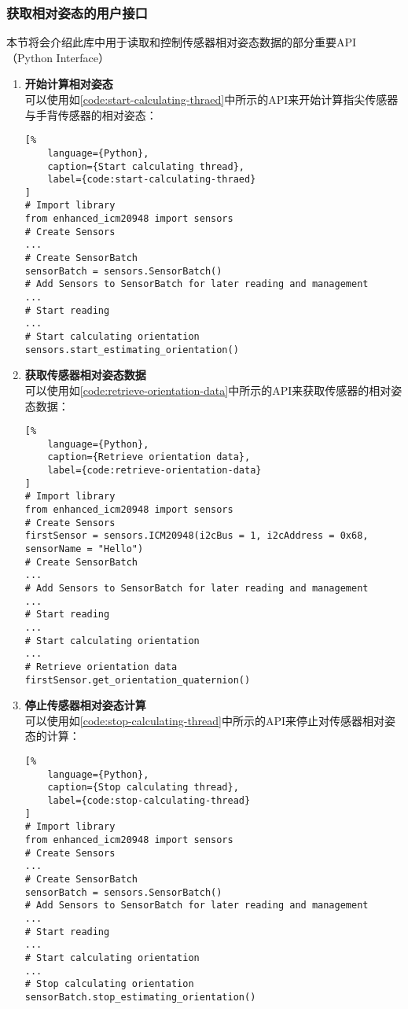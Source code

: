 \subsubsection{获取相对姿态的用户接口}
本节将会介绍此库中用于读取和控制传感器相对姿态数据的部分重要API（Python Interface）
\begin{enumerate}[label=(\alph*)]
    \item {\bfseries 开始计算相对姿态} \\
可以使用如\autoref{code:start-calculating-thraed}中所示的API来开始计算指尖传感器与手背传感器的相对姿态：
\begin{lstlisting}[%
    language={Python},
    caption={Start calculating thread},
    label={code:start-calculating-thraed}
]
# Import library
from enhanced_icm20948 import sensors
# Create Sensors
...
# Create SensorBatch
sensorBatch = sensors.SensorBatch()
# Add Sensors to SensorBatch for later reading and management
...
# Start reading
...
# Start calculating orientation
sensors.start_estimating_orientation()
\end{lstlisting}
    \item {\bfseries 获取传感器相对姿态数据} \\
可以使用如\autoref{code:retrieve-orientation-data}中所示的API来获取传感器的相对姿态数据：
\begin{lstlisting}[%
    language={Python},
    caption={Retrieve orientation data},
    label={code:retrieve-orientation-data}
]
# Import library
from enhanced_icm20948 import sensors
# Create Sensors
firstSensor = sensors.ICM20948(i2cBus = 1, i2cAddress = 0x68, sensorName = "Hello")
# Create SensorBatch
...
# Add Sensors to SensorBatch for later reading and management
...
# Start reading
...
# Start calculating orientation
...
# Retrieve orientation data
firstSensor.get_orientation_quaternion()
\end{lstlisting}
    \item {\bfseries 停止传感器相对姿态计算} \\
可以使用如\autoref{code:stop-calculating-thread}中所示的API来停止对传感器相对姿态的计算：
\begin{lstlisting}[%
    language={Python},
    caption={Stop calculating thread},
    label={code:stop-calculating-thread}
]
# Import library
from enhanced_icm20948 import sensors
# Create Sensors
...
# Create SensorBatch
sensorBatch = sensors.SensorBatch()
# Add Sensors to SensorBatch for later reading and management
...
# Start reading
...
# Start calculating orientation
...
# Stop calculating orientation
sensorBatch.stop_estimating_orientation()
\end{lstlisting}
\end{enumerate}

